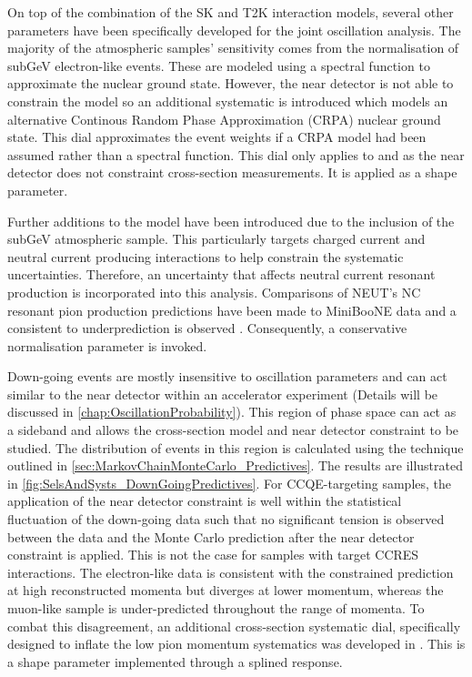 
On top of the combination of the SK and T2K interaction models, several other parameters have been specifically developed for the joint oscillation analysis. The majority of the atmospheric samples'  sensitivity comes from the normalisation of subGeV electron-like events. These are modeled using a spectral function to approximate the nuclear ground state. However, the near detector is not able to constrain the model so an additional systematic is introduced which models an alternative Continous Random Phase Approximation (CRPA) nuclear ground state. This dial approximates the event weights if a CRPA model had been assumed rather than a spectral function. This dial only applies to  and  as the near detector does not constraint  cross-section measurements. It is applied as a shape parameter.

Further additions to the model have been introduced due to the inclusion of the subGeV  atmospheric sample. This particularly targets charged current and neutral current  producing interactions to help constrain the systematic uncertainties. Therefore, an uncertainty that affects neutral current resonant  production is incorporated into this analysis. Comparisons of NEUT's NC resonant pion production predictions have been made to MiniBooNE \cite{MB_NC1pi0} data and a consistent  to  underprediction is observed \cite{t2k_tn_422}. Consequently, a conservative  normalisation parameter is invoked. 

Down-going events are mostly insensitive to oscillation parameters and can act similar to the near detector within an accelerator experiment (Details will be discussed in \autoref{chap:OscillationProbability}). This region of phase space can act as a sideband and allows the cross-section model and near detector constraint to be studied. The distribution of events in this region is calculated using the technique outlined in \autoref{sec:MarkovChainMonteCarlo_Predictives}. The results are illustrated in \autoref{fig:SelsAndSysts_DownGoingPredictives}. For CCQE-targeting samples, the application of the near detector constraint is well within the statistical fluctuation of the down-going data such that no significant tension is observed between the data and the Monte Carlo prediction after the near detector constraint is applied. This is not the case for samples with target CCRES interactions. The electron-like data is consistent with the constrained prediction at high reconstructed momenta but diverges at lower momentum, whereas the muon-like sample is under-predicted throughout the range of momenta. To combat this disagreement, an additional cross-section systematic dial, specifically designed to inflate the low pion momentum systematics was developed in \cite{t2k_tn_422}. This is a shape parameter implemented through a splined response. 

